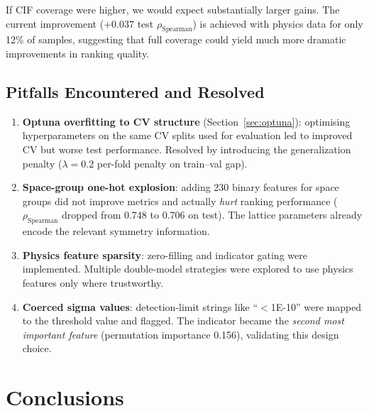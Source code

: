 \documentclass[11pt,a4paper]{article}
\newcommand{\rhoS}{\rho_{\text{Spearman}}}
\begin{document}
If CIF coverage were higher, we would expect substantially larger gains.
The current improvement ($+0.037$ test $\rhoS$) is achieved with physics
data for only 12\% of samples, suggesting that full coverage could yield
much more dramatic improvements in ranking quality.

\subsection{Pitfalls Encountered and Resolved}

\begin{enumerate}[leftmargin=*]
      \item \textbf{Optuna overfitting to CV structure} (Section~\ref{sec:optuna}):
            optimising hyperparameters on the same CV splits used for evaluation
            led to improved CV but worse test performance.  Resolved by
            introducing the generalization penalty
            ($\lambda = 0.2$ per-fold penalty on train--val gap).

      \item \textbf{Space-group one-hot explosion}: adding 230 binary features
            for space groups did not improve metrics and actually \emph{hurt}
            ranking performance ($\rhoS$ dropped from 0.748 to 0.706 on test).
            The lattice parameters already encode the relevant symmetry
            information.

      \item \textbf{Physics feature sparsity}: zero-filling and indicator
            gating were implemented.  Multiple double-model strategies were
            explored to use physics features only where trustworthy.

      \item \textbf{Coerced sigma values}: detection-limit strings like
            ``$<$1E-10'' were mapped to the threshold value and flagged.  The
            indicator became the \emph{second most important feature}
            (permutation importance 0.156), validating this design choice.
\end{enumerate}

\section{Conclusions}
\end{document}
